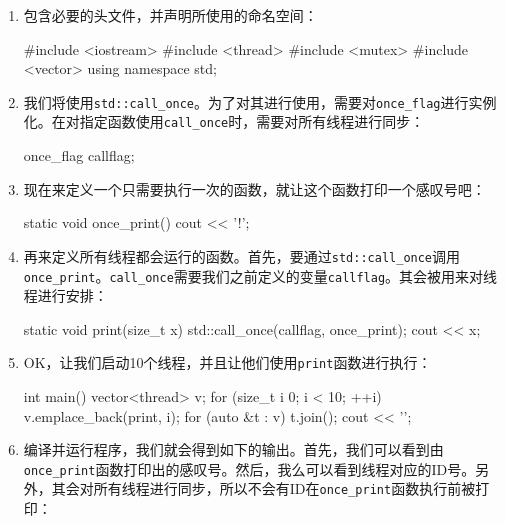 \begin{enumerate}
\item 包含必要的头文件，并声明所使用的命名空间：

\begin{codebox}[cpp]
#include <iostream>
#include <thread>
#include <mutex>
#include <vector>
using namespace std; 
\end{codebox}

\item 我们将使用\texttt{std::call\_once}。为了对其进行使用，需要对\texttt{once\_flag}进行实例化。在对指定函数使用\texttt{call\_once}时，需要对所有线程进行同步：

\begin{codebox}[cpp]
once_flag callflag;
\end{codebox}

\item 现在来定义一个只需要执行一次的函数，就让这个函数打印一个感叹号吧：

\begin{codebox}[cpp]
static void once_print()
{
    cout << '!';
}
\end{codebox}

\item 再来定义所有线程都会运行的函数。首先，要通过\texttt{std::call\_once}调用\texttt{once\_print}。\texttt{call\_once}需要我们之前定义的变量\texttt{callflag}。其会被用来对线程进行安排：

\begin{codebox}[cpp]
static void print(size_t x)
{
    std::call_once(callflag, once_print);
    cout << x;
}
\end{codebox}

\item OK，让我们启动10个线程，并且让他们使用\texttt{print}函数进行执行：

\begin{codebox}[cpp]
int main()
{
    vector<thread> v;
    for (size_t i {0}; i < 10; ++i) {
        v.emplace_back(print, i);
    }
    for (auto &t : v) { t.join(); }
    cout << '\n';
}
\end{codebox}

\item 编译并运行程序，我们就会得到如下的输出。首先，我们可以看到由\texttt{once\_print}函数打印出的感叹号。然后，我么可以看到线程对应的ID号。另外，其会对所有线程进行同步，所以不会有ID在\texttt{once\_print}函数执行前被打印：


\end{enumerate}

